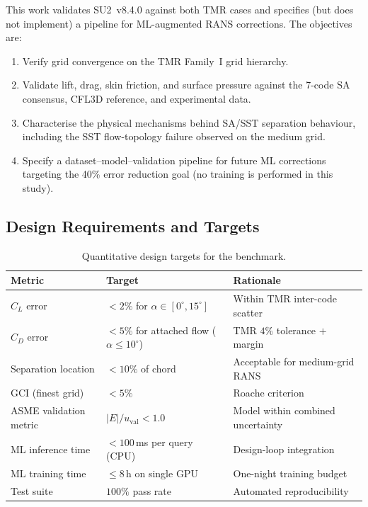\documentclass[11pt,a4paper]{article}
\begin{document}
This work validates SU2~v8.4.0 \cite{SU2_2016} against both TMR cases and
specifies (but does not implement) a pipeline for ML-augmented RANS corrections.
The objectives are:
\begin{enumerate}
  \item Verify grid convergence on the TMR Family~I grid hierarchy.
  \item Validate lift, drag, skin friction, and surface pressure against
    the 7-code SA consensus, CFL3D reference, and experimental data.
  \item Characterise the physical mechanisms behind SA/SST separation behaviour,
    including the SST flow-topology failure observed on the medium grid.
  \item Specify a dataset--model--validation pipeline for future ML corrections
    targeting the 40\% error reduction goal (no training is performed in this study).
\end{enumerate}

\subsection{Design Requirements and Targets}
\label{sec:targets}

\begin{table}[!ht]
\centering
\caption{Quantitative design targets for the benchmark.}
\label{tab:targets}
\begin{tabular}{lll}
\toprule
\textbf{Metric} & \textbf{Target} & \textbf{Rationale} \\
\midrule
$C_L$ error & $<2\%$ for $\alpha\in[0^\circ,15^\circ]$
  & Within TMR inter-code scatter \\
$C_D$ error & $<5\%$ for attached flow ($\alpha\le10^\circ$)
  & TMR $4\%$ tolerance $+$ margin \\
Separation location & $<10\%$ of chord
  & Acceptable for medium-grid RANS \\
GCI (finest grid) & $<5\%$
  & Roache criterion \cite{Roache1998} \\
ASME validation metric & $|E|/u_\text{val}<1.0$
  & Model within combined uncertainty \\
ML inference time & $<100$\,ms per query (CPU)
  & Design-loop integration \\
ML training time & $\le 8$\,h on single GPU
  & One-night training budget \\
Test suite & $100\%$ pass rate
  & Automated reproducibility \\
\bottomrule
\end{tabular}
\end{table}
\end{document}
